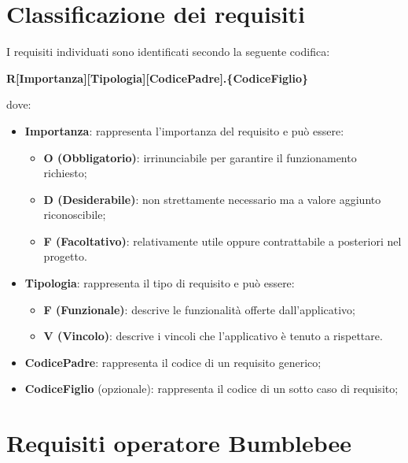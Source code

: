 \section{Classificazione dei requisiti}
I requisiti individuati sono identificati secondo la seguente codifica:
\begin{center}
\textbf{R[Importanza][Tipologia][CodicePadre].\{CodiceFiglio\}}\\
\end{center}
dove:


\begin{itemize}
\item {\textbf{Importanza}: rappresenta l'importanza del requisito e può essere:
	\begin{itemize}
	\item {\textbf{O (Obbligatorio)}: irrinunciabile per garantire il funzionamento richiesto;}
	\item {\textbf{D (Desiderabile)}: non strettamente necessario ma a valore aggiunto riconoscibile;}
	\item {\textbf{F (Facoltativo)}: relativamente utile oppure contrattabile a posteriori nel progetto.}
	\end{itemize}
}
\item{\textbf{Tipologia}: rappresenta il tipo di requisito e può essere:
\begin{itemize}
\item \textbf{F (Funzionale)}: descrive le funzionalità  offerte dall'applicativo;
\item \textbf{V (Vincolo)}: descrive i vincoli che l'applicativo è tenuto a rispettare.
\end{itemize}}
\item \textbf{CodicePadre}: rappresenta il codice di un requisito generico;
\item \textbf{CodiceFiglio} (opzionale): rappresenta il codice di un sotto caso di requisito;
\end{itemize}


\section{Requisiti operatore Bumblebee}
